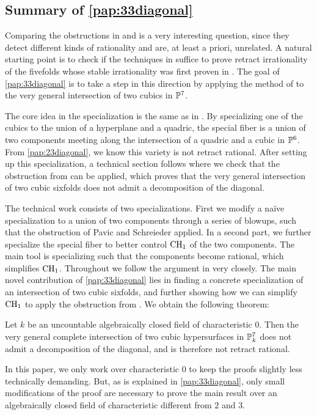 \subsection{Summary of \cref{pap:33diagonal}}
Comparing the obstructions in \cite{NicaiseOttem} and \cite{PavicSchreieder} is a very interesting question, since they detect different kinds of rationality and are, at least a priori, unrelated. A natural starting point is to check if the techniques in \cite{PavicSchreieder} suffice to prove retract irrationality of the fivefolds whose stable irrationality was first proven in \cite{NicaiseOttem}. The goal of \cref{pap:33diagonal} is to take a step in this direction by applying the method of \cite{PavicSchreieder} to the very general intersection of two cubics in $\P^7$.

The core idea in the specialization is the same as in \cite[Theorem 7.2]{NicaiseOttem}. By specializing one of the cubics to the union of a hyperplane and a quadric, the special fiber is a union of two components meeting along the intersection of a quadric and a cubic in $\P^6$. From \cref{pap:23diagonal}, we know this variety is not retract rational. After setting up this specialization, a technical section follows where we check that the obstruction from \cite{PavicSchreieder} can be applied, which proves that the very general intersection of two cubic sixfolds does not admit a decomposition of the diagonal.

The technical work consists of two specializations. First we modify a naïve specialization to a union of two components through a series of blowups, such that the obstruction of Pavic and Schreieder applied. In a second part, we further specialize the special fiber to better control $\CH_1$ of the two components. The main tool is specializing such that the components become rational, which simplifies $\CH_1$. Throughout we follow the argument in \cite{PavicSchreieder} very closely. The main novel contribution of \cref{pap:33diagonal} lies in finding a concrete specialization of an intersection of two cubic sixfolds, and further showing how we can simplify $\CH_1$ to apply the obstruction from \cite{PavicSchreieder}. We obtain the following theorem:
\begin{theorem}
	Let $k$ be an uncountable algebraically closed field of characteristic $0$. Then the very general complete intersection of two cubic hypersurfaces in $\P^7_k$ does not admit a decomposition of the diagonal, and is therefore not retract rational.
\end{theorem}
In this paper, we only work over characteristic $0$ to keep the proofs slightly less technically demanding. But, as is explained in \cref{pap:33diagonal}, only small modifications of the proof are necessary to prove the main result over an algebraically closed field of characteristic different from $2$ and $3$.

